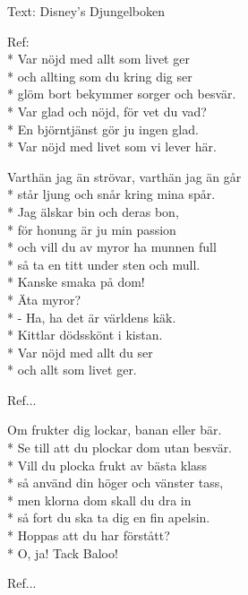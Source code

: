 \begin{SongText}
    \begin{SongInfo}
        Text: Disney's Djungelboken
    \end{SongInfo}
    \begin{SongVerse}
        Ref:\\*%
        Var nöjd med allt som livet ger\\*%
        och allting som du kring dig ser\\*%
        glöm bort bekymmer sorger och besvär.\\*%
        Var glad och nöjd, för vet du vad?\\*%
        En björntjänst gör ju ingen glad.\\*%
        Var nöjd med livet som vi lever här.
    \end{SongVerse}
    \begin{SongVerse}
        Varthän jag än strövar, varthän jag än går\\*%
        står ljung och snår kring mina spår.\\*%
        Jag älskar bin och deras bon,\\*%
        för honung är ju min passion\\*%
        och vill du av myror ha munnen full\\*%
        så ta en titt under sten och mull.\\*%
        Kanske smaka på dom!\\*%
        Äta myror?\\*%
        - Ha, ha det är världens käk.\\*%
        Kittlar dödsskönt i kistan.\\*%
        Var nöjd med allt du ser\\*%
        och allt som livet ger.
    \end{SongVerse}
    \begin{SongVerse}
        Ref...
    \end{SongVerse}
    \begin{SongVerse}
        Om frukter dig lockar, banan eller bär.\\*%
        Se till att du plockar dom utan besvär.\\*%
        Vill du plocka frukt av bästa klass\\*%
        så använd din höger och vänster tass,\\*%
        men klorna dom skall du dra in\\*%
        så fort du ska ta dig en fin apelsin.\\*%
        Hoppas att du har förstått?\\*%
        O, ja! Tack Baloo!
    \end{SongVerse}
    \begin{SongVerse}
        Ref...
    \end{SongVerse}
\end{SongText}
